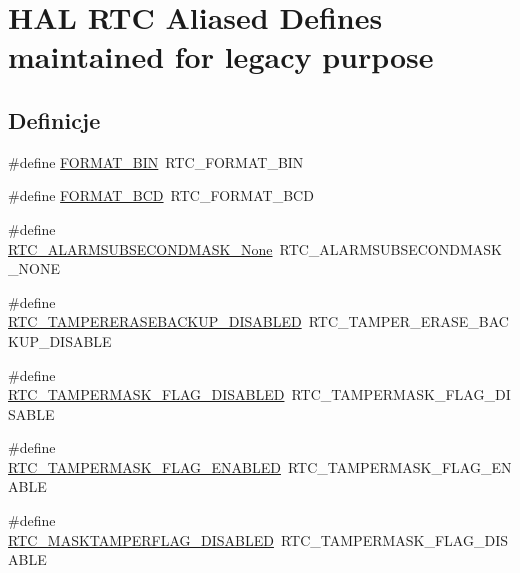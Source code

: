 \hypertarget{group___h_a_l___r_t_c___aliased___defines}{}\section{H\+AL R\+TC Aliased Defines maintained for legacy purpose}
\label{group___h_a_l___r_t_c___aliased___defines}
\subsection*{Definicje}
\begin{DoxyCompactItemize}
\item 
\#define \hyperlink{group___h_a_l___r_t_c___aliased___defines_ga1adf0882a1368a3cef0edc34dcf8d34e}{F\+O\+R\+M\+A\+T\+\_\+\+B\+IN}~R\+T\+C\+\_\+\+F\+O\+R\+M\+A\+T\+\_\+\+B\+IN
\item 
\#define \hyperlink{group___h_a_l___r_t_c___aliased___defines_ga950fc88b539cc9a8cf66aab2ee860fe1}{F\+O\+R\+M\+A\+T\+\_\+\+B\+CD}~R\+T\+C\+\_\+\+F\+O\+R\+M\+A\+T\+\_\+\+B\+CD
\item 
\#define \hyperlink{group___h_a_l___r_t_c___aliased___defines_ga242adf20d2422fd1ae7715b8acd82623}{R\+T\+C\+\_\+\+A\+L\+A\+R\+M\+S\+U\+B\+S\+E\+C\+O\+N\+D\+M\+A\+S\+K\+\_\+\+None}~R\+T\+C\+\_\+\+A\+L\+A\+R\+M\+S\+U\+B\+S\+E\+C\+O\+N\+D\+M\+A\+S\+K\+\_\+\+N\+O\+NE
\item 
\#define \hyperlink{group___h_a_l___r_t_c___aliased___defines_ga55d9466b1ec35bce5df17af28e142014}{R\+T\+C\+\_\+\+T\+A\+M\+P\+E\+R\+E\+R\+A\+S\+E\+B\+A\+C\+K\+U\+P\+\_\+\+D\+I\+S\+A\+B\+L\+ED}~R\+T\+C\+\_\+\+T\+A\+M\+P\+E\+R\+\_\+\+E\+R\+A\+S\+E\+\_\+\+B\+A\+C\+K\+U\+P\+\_\+\+D\+I\+S\+A\+B\+LE
\item 
\#define \hyperlink{group___h_a_l___r_t_c___aliased___defines_gad032982f8c14ffd4864df3ebfee45f70}{R\+T\+C\+\_\+\+T\+A\+M\+P\+E\+R\+M\+A\+S\+K\+\_\+\+F\+L\+A\+G\+\_\+\+D\+I\+S\+A\+B\+L\+ED}~R\+T\+C\+\_\+\+T\+A\+M\+P\+E\+R\+M\+A\+S\+K\+\_\+\+F\+L\+A\+G\+\_\+\+D\+I\+S\+A\+B\+LE
\item 
\#define \hyperlink{group___h_a_l___r_t_c___aliased___defines_gac03d2b586cb1c5c471697b57864e7bc8}{R\+T\+C\+\_\+\+T\+A\+M\+P\+E\+R\+M\+A\+S\+K\+\_\+\+F\+L\+A\+G\+\_\+\+E\+N\+A\+B\+L\+ED}~R\+T\+C\+\_\+\+T\+A\+M\+P\+E\+R\+M\+A\+S\+K\+\_\+\+F\+L\+A\+G\+\_\+\+E\+N\+A\+B\+LE
\item 
\#define \hyperlink{group___h_a_l___r_t_c___aliased___defines_ga968bde232135b78ff974d5523890860d}{R\+T\+C\+\_\+\+M\+A\+S\+K\+T\+A\+M\+P\+E\+R\+F\+L\+A\+G\+\_\+\+D\+I\+S\+A\+B\+L\+ED}~R\+T\+C\+\_\+\+T\+A\+M\+P\+E\+R\+M\+A\+S\+K\+\_\+\+F\+L\+A\+G\+\_\+\+D\+I\+S\+A\+B\+LE

\end{DoxyCompactItemize}
